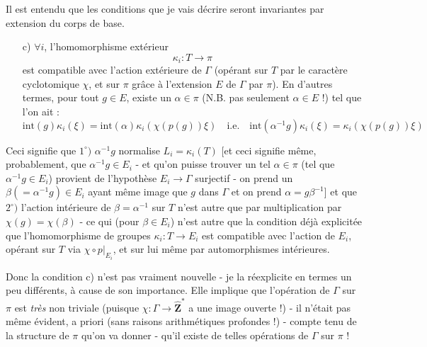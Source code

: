 Il est entendu que les conditions que je vais décrire seront invariantes par extension du corps de base.
\begin{enumerate}    
    \item[c)] $\forall i$, l'homomorphisme extérieur
    $$
    \kappa_i: T \to \pi
    $$
    est compatible avec l'action extérieure de $\Gamma$ (opérant sur $T$ par le caractère cyclotomique $\chi$, et sur $\pi$ grâce à l'extension $E$ de $\Gamma$ par $\pi$). En d'autres termes, pour tout $g \in E$, existe un $\alpha \in \pi$ (N.B. pas seulement $\alpha \in E$ !) tel que l'on ait :
    $$
    \text{int}(g)\kappa_i(\xi) = \text{int}(\alpha)\kappa_i(\chi(p(g))\xi) \quad \text{i.e.} \quad \text{int}(\alpha^{-1}g)\kappa_i(\xi) = \kappa_i(\chi(p(g))\xi)
    $$
\end{enumerate}
Ceci signifie que $1^\circ)$ $\alpha^{-1}g$ normalise $L_i = \kappa_i(T)$ [et ceci signifie même, probablement, que $\alpha^{-1}g \in E_i$ - et qu'on puisse trouver un tel $\alpha \in \pi$ (tel que $\alpha^{-1}g \in E_i$) provient de l'hypothèse $E_i \to \Gamma$ surjectif - on prend un $\beta (= \alpha^{-1}g) \in E_i$ ayant même image que $g$ dans $\Gamma$ et on prend $\alpha = g \beta^{-1}$] et que $2^\circ)$ l'action intérieure de $\beta = \alpha^{-1}$ sur $T$ n'est autre que par multiplication par $\chi(g) = \chi(\beta)$ - ce qui (pour $\beta \in E_i$) n'est autre que la condition déjà explicitée que l'homomorphisme de groupes $\kappa_i: T \to E_i$ est compatible avec l'action de $E_i$, opérant sur $T$ via $\chi \circ p|_{E_i}$, et sur lui même par automorphismes intérieures.

Donc la condition c) n'est pas vraiment nouvelle - je la réexplicite en termes un peu différents, à cause de son importance. Elle implique que l'opération de $\Gamma$ sur $\pi$ est \emph{très} non triviale (puisque $\chi: \Gamma \to \widehat{\mathbf{Z}}^*$ a une image ouverte !) - il n'était pas même évident, a priori (sans raisons arithmétiques profondes !) - compte tenu de la structure de $\pi$ qu'on va donner - qu'il existe de telles opérations de $\Gamma$ sur $\pi$ !

